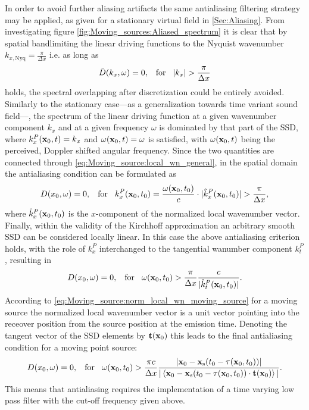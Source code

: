 In order to avoid further aliasing artifacts the same antialiasing filtering strategy may be applied, as given for a stationary virtual field in \ref{Sec:Aliasing}.
From investigating figure \ref{fig:Moving_sources:Aliased_spectrum} it is clear that by spatial bandlimiting the linear driving functions to the Nyquist wavenumber $k_{x,\mathrm{Nyq}} = \frac{\pi}{\Delta x}$ i.e. as long as 
\begin{equation}
\tilde{D}(k_x,\omega) = 0, \hspace{3mm} \text{for} \hspace{3mm}  |k_x| > \frac{\pi}{\Delta x}
\end{equation}
holds, the spectral overlapping after discretization could be entirely avoided.
Similarly to the stationary case---as a generalization towards time variant sound field---, the spectrum of the linear driving function at a given wavenumber component $k_x$ and at a given frequency $\omega$ is dominated by that part of the SSD, where $k_x^P(\mathbf{x}_0,t) = k_x$ and $\omega(\mathbf{x}_0,t) = \omega$ is satisfied, with $\omega(\mathbf{x}_0,t)$ being the perceived, Doppler shifted angular frequency.
Since the two quantities are connected through \eqref{eq:Moving_source:local_wn_general}, in the spatial domain the antialiasing condition can be formulated as
\begin{equation}
D(x_0,\omega) = 0, \hspace{3mm} \text{for} \hspace{3mm}  k_x^P(\mathbf{x}_0,t_0) = \frac{\omega(\mathbf{x}_0,t_0)}{c} \cdot |\hat{k}_x^P(\mathbf{x}_0,t_0)|  > \frac{\pi}{\Delta x},
\end{equation}
where $\hat{k}_x^P(\mathbf{x}_0,t_0)$ is the $x$-component of the normalized local wavenumber vector.
Finally, within the validity of the Kirchhoff approximation an arbitrary smooth SSD can be considered locally linear.
In this case the above antialiasing criterion holds, with the role of $k_x^P$ interchanged to the tangential wanumber component $k_t^P$, resulting in 
\begin{equation}
D(x_0,\omega) = 0, \hspace{3mm} \text{for} \hspace{3mm} \omega(\mathbf{x}_0,t_0) > \frac{\pi}{\Delta x} \frac{c}{|\hat{k}_t^P(\mathbf{x}_0,t_0)|}.
\end{equation}
According to \eqref{eq:Moving_source:norm_local_wn_moving_source} for a moving source the normalized local wavenumber vector is a unit vector pointing into the receover position from the source position at the emission time.
Denoting the tangent vector of the SSD elements by $\mathbf{t}(\mathbf{x}_0)$ this leads to the final antialiasing condition for a moving point source:
\begin{equation}
D(x_0,\omega) = 0, \hspace{3mm} \text{for} \hspace{3mm} \omega(\mathbf{x}_0,t_0) > \frac{\pi c}{\Delta x} \frac{|\mathbf{x}_0-\mathbf{x}_{\mathrm{s}}(t_0-\tau(\mathbf{x}_0,t_0))|}
{|\left< \mathbf{x}_0-\mathbf{x}_{\mathrm{s}}(t_0-\tau(\mathbf{x}_0,t_0)) \cdot \mathbf{t}(\mathbf{x}_0) \right>|}.
\label{Eq:Moving_source:Antialiasing_cutoff_freq}
\end{equation}
This means that antialiasing requires the implementation of a time varying low pass filter with the cut-off frequency given above.

